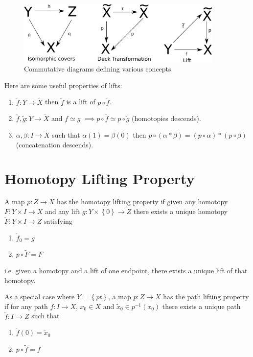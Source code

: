 \documentclass[11pt]{article}
\newenvironment{defin}
	{\begin{mdframed}[backgroundcolor=white, roundcorner=5pt, linewidth=1pt]}
	{\end{mdframed}}
\newcommand{\mdf}[1]{{\color{red} #1}}
\begin{document}
\begin{figure}[ht]
	\centering
	\includegraphics[width=4in]{basicdefs_diagrams.png}	
	\caption{Commutative diagrams defining various concepts}
\end{figure}

Here are some useful properties of lifts: 
\begin{enumerate}[label=(\roman*)]
	\item $\widetilde{f}:Y\to\widetilde{X}$ then $\widetilde{f}$ is a lift of $p\circ\widetilde{f}$.
	\item $\widetilde{f},\widetilde{g}:Y\to\widetilde{X}$ and $f\simeq g$ $\implies p\circ \widetilde{f}\simeq p\circ \widetilde{g}$ (homotopies descends).
	\item $\alpha, \beta: I \to \widetilde{X}$ such that $\alpha(1)=\beta(0)$ then $p\circ (\alpha\ast\beta)=(p\circ\alpha)\ast(p\circ\beta)$ (concatenation descends).
\end{enumerate}

\section{Homotopy Lifting Property}
\begin{defin}
	A map $p:Z\to X$ has the \mdf{homotopy lifting property} if given any homotopy $F:Y\times I \to X$ and any lift $g:Y\times\left\{0\right\}\to Z$ there exists a unique homotopy $\widetilde{F}:Y\times I \to Z$ satisfying
	\begin{enumerate}[label=(\roman*)]
		\item $\widetilde{f}_0=g$
		\item $p\circ\widetilde{F}=F$
	\end{enumerate}
	i.e. given a homotopy and a lift of one endpoint, there exists a unique lift of that homotopy.

	As a special case where $Y=\left\{pt\right\}$, a map $p:Z\to X$ has the \mdf{path lifting property} if for any path $f:I\to X$, $x_0\in X$ and $\widetilde{x}_0\in p^{-1}(x_0)$ there exists a unique path $\widetilde{f}:I\to Z$ such that 
	\begin{enumerate}[label=(\roman*)]
		\item $\widetilde{f}(0)=\widetilde{x}_0$
		\item $p\circ\widetilde{f}=f$
	\end{enumerate}
\end{defin}
\end{document}
